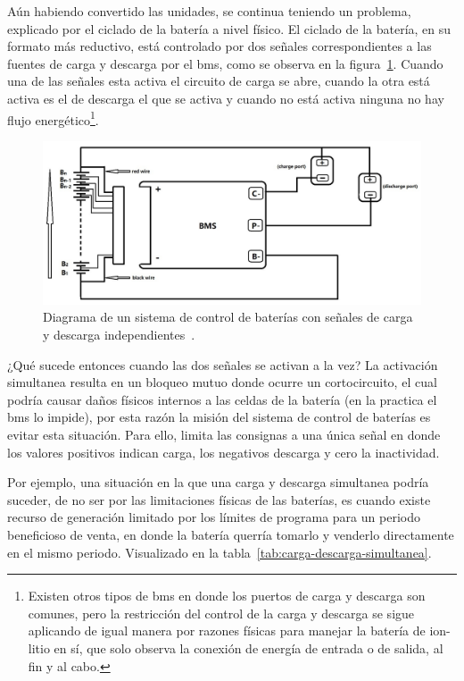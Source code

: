 Aún habiendo convertido las unidades, se continua teniendo un problema, explicado por el ciclado de la batería a nivel físico. El ciclado de la batería, en su formato más reductivo, está controlado por dos señales correspondientes a las fuentes de carga y descarga por el \gls{bms}, como se observa en la figura~\ref{fig:carga-descarga}. Cuando una de las señales esta activa el circuito de carga se abre, cuando la otra está activa es el de descarga el que se activa y cuando no está activa ninguna no hay flujo energético\footnote{Existen otros tipos de \gls{bms} en donde los puertos de carga y descarga son comunes, pero la restricción del control de la carga y descarga se sigue aplicando de igual manera por razones físicas para manejar la batería de ion-litio en sí, que solo observa la conexión de energía de entrada o de salida, al fin y al cabo.}.

\begin{figure}
  \centering
  \includegraphics[width=0.75\linewidth]{figures/carga-descarga.png}
  \caption[Diagrama de un sistema de control de baterías.]{Diagrama de un sistema de control de baterías con señales de carga y descarga independientes~\cite{sunkko2025two}.}
  \label{fig:carga-descarga}
\end{figure}

¿Qué sucede entonces cuando las dos señales se activan a la vez? La activación simultanea resulta en un bloqueo mutuo donde ocurre un cortocircuito, el cual podría causar daños físicos internos a las celdas de la batería (en la practica el \gls{bms} lo impide), por esta razón la misión del sistema de control de baterías es evitar esta situación. Para ello, limita las consignas a una única señal en donde los valores positivos indican carga, los negativos descarga y cero la inactividad.

Por ejemplo, una situación en la que una carga y descarga simultanea podría suceder, de no ser por las limitaciones físicas de las baterías, es cuando existe recurso de generación limitado por los límites de programa para un periodo beneficioso de venta, en donde la batería querría tomarlo y venderlo directamente en el mismo periodo. Visualizado en la tabla~\ref{tab:carga-descarga-simultanea}.

